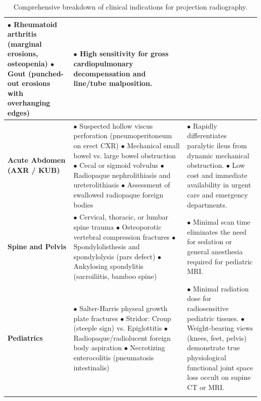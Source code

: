 \documentclass[11pt,a4paper]{article}
\begin{document}
\begin{longtable}{p{3.2cm}p{6cm}p{6cm}}
$\bullet$ Rheumatoid arthritis (marginal erosions, osteopenia)\newline
$\bullet$ Gout (punched-out erosions with overhanging edges) & 
$\bullet$ High sensitivity for gross cardiopulmonary decompensation and line/tube malposition. \\
\midrule
\textbf{Acute Abdomen (AXR / KUB)} & 
$\bullet$ Suspected hollow viscus perforation (pneumoperitoneum on erect CXR)\newline
$\bullet$ Mechanical small bowel vs. large bowel obstruction\newline
$\bullet$ Cecal or sigmoid volvulus\newline
$\bullet$ Radiopaque nephrolithiasis and ureterolithiasis\newline
$\bullet$ Assessment of swallowed radiopaque foreign bodies & 
$\bullet$ Rapidly differentiates paralytic ileus from dynamic mechanical obstruction.\newline
$\bullet$ Low cost and immediate availability in urgent care and emergency departments. \\
\midrule
\textbf{Spine and Pelvis} & 
$\bullet$ Cervical, thoracic, or lumbar spine trauma\newline
$\bullet$ Osteoporotic vertebral compression fractures\newline
$\bullet$ Spondylolisthesis and spondylolysis (pars defect)\newline
$\bullet$ Ankylosing spondylitis (sacroiliitis, bamboo spine) & 
$\bullet$ Minimal scan time eliminates the need for sedation or general anesthesia required for pediatric MRI. \\
\midrule
\textbf{Pediatrics} & 
$\bullet$ Salter-Harris physeal growth plate fractures\newline
$\bullet$ Stridor: Croup (steeple sign) vs. Epiglottitis\newline
$\bullet$ Radiopaque/radiolucent foreign body aspiration\newline
$\bullet$ Necrotizing enterocolitis (pneumatosis intestinalis) & 
$\bullet$ Minimal radiation dose for radiosensitive pediatric tissues.\newline
$\bullet$ Weight-bearing views (knees, feet, pelvis) demonstrate true physiological functional joint space loss occult on supine CT or MRI. \\
\bottomrule
\caption{Comprehensive breakdown of clinical indications for projection radiography.}
\label{tab:clinical_indications}
\end{longtable}
\end{document}
